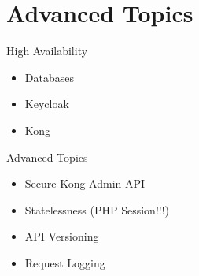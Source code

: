 \section{Advanced Topics}


\begin{frame}{High Availability}
	\begin{itemize}
		\item Databases
		\item Keycloak
		\item Kong
	\end{itemize}
\end{frame}


\begin{frame}{Advanced Topics}
	\begin{itemize}
		\item Secure Kong Admin API
		\item Statelessness (PHP Session!!!)
		\item API Versioning
		\item Request Logging
	\end{itemize}
\end{frame}
